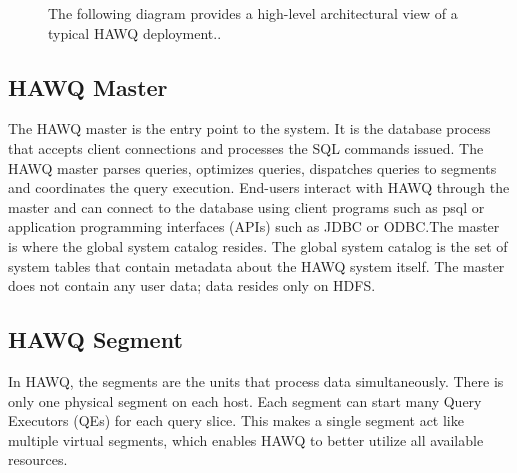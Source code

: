 \documentclass[9pt,twocolumn,twoside]{../../styles/osajnl}
\begin{document}
\begin{figure}[htbp]
	\centering
	\caption{{The following diagram provides a high-level 
	architectural view of a typical HAWQ 
	deployment.}\cite{www-hawq-arch-image}.}
	\label{fig:false-color}
\end{figure}

\subsection{HAWQ Master}

The HAWQ master is the entry point to the system. It is the database 
process that accepts client connections and processes the SQL 
commands issued. The HAWQ master parses queries, optimizes queries, 
dispatches queries to segments and coordinates the query execution.
End-users interact with HAWQ through the master and can connect to 
the database using client programs such as psql or application 
programming interfaces (APIs) such as JDBC or ODBC.The master is 
where the global system catalog resides. The global system catalog is 
the set of system tables that contain metadata about the HAWQ system 
itself. The master does not contain any user data; data resides only 
on HDFS. 

\subsection{HAWQ Segment}

In HAWQ, the segments are the units that process data simultaneously. 
There is only one physical segment on each host. Each segment can 
start many Query Executors (QEs) for each query slice. This makes a 
single segment act like multiple virtual segments, which enables HAWQ 
to better utilize all available resources.
\end{document}
